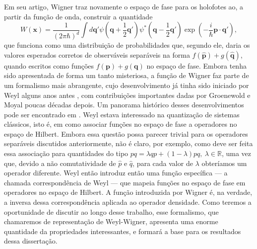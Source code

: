 \documentclass[
	12pt,
	oneside,			%
	a4paper,			%
	english,			%
	brazil				%
	]{abntex2}
\theoremstyle{definition}
\begin{document}
Em seu artigo, Wigner traz novamente o espaço de fase para os holofotes ao, a partir da função de onda, construir a quantidade
\begin{equation}
\label{função de wigner introdução}
    W\left(\mathbf{x}\right) = \frac{1}{(2\pi \hbar)^d} \int d \mathbf{q}' \psi\left(\mathbf{q}+\frac{1}{2}\mathbf{q}'\right) \psi^*\left(\mathbf{q}-\frac{1}{2}\mathbf{q}'\right) \exp \left( -\frac{i}{\hbar} \mathbf{p} \cdot\mathbf{q}' \right),
\end{equation}
que funciona como uma distribuição de probabilidades que, segundo ele, daria os valores esperados corretos de observáveis separáveis na forma $f(\hat{\mathbf{p}}) + g(\hat{\mathbf{q}})$, quando escritos como funções $f(\mathbf{p})+g(\mathbf{q})$ no espaço de fase. Embora tenha sido apresentada de forma um tanto misteriosa, a função de Wigner faz parte de um formalismo mais abrangente, cujo desenvolvimento já tinha sido iniciado por Weyl alguns anos antes \cite{weyl1927quantenmechanik}, com contribuições importantes dadas por Groenewold \cite{GROENEWOLD1946405} e Moyal \cite{moyal1949quantum} poucas décadas depois. Um panorama histórico desses desenvolvimentos pode ser encontrado em \cite{curtright2013concise}. Weyl estava interessado na quantização de sistemas clássicos, isto é, em como associar funções no espaço de fase a operadores no espaço de Hilbert. Embora essa questão possa parecer trivial para os operadores separáveis discutidos anteriormente, não é claro, por exemplo, como deve ser feita essa associação para quantidades do tipo $pq = \lambda qp + (1-\lambda)pq, \ \lambda \in \mathbb{R}$, uma vez que, devido a não comutatividade de $\hat{p}$ e $\hat{q}$, para cada valor de $\lambda$ obteríamos um operador diferente. Weyl então introduz então uma função específica — a chamada correspondência de Weyl \cite{curtright2013concise} — que mapeia funções no espaço de fase em operadores no espaço de Hilbert. A função introduzida por Wigner é, na verdade, a inversa dessa correspondência aplicada ao operador densidade. Como teremos a oportunidade de discutir ao longo desse trabalho, esse formalismo, que chamaremos de representação de Weyl-Wigner, apresenta uma enorme quantidade da propriedades interessantes, e formará a base para os resultados dessa dissertação.
\end{document}
